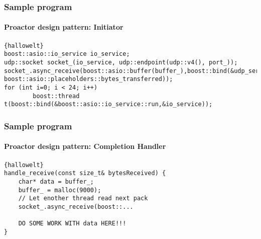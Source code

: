 \begin{frame}[fragile]
\frametitle{Sample program}
\framesubtitle{Proactor design pattern: Initiator}
\begin{lstlisting}[frame=trBL,caption={}]{hallowelt}
boost::asio::io_service io_service;
udp::socket socket_(io_service, udp::endpoint(udp::v4(), port_));
socket_.async_receive(boost::asio::buffer(buffer_),boost::bind(&udp_server::handle_receive,this, boost::asio::placeholders::bytes_transferred)); 
for (int i=0; i < 24; i++) 
		boost::thread t(boost::bind(&boost::asio::io_service::run,&io_service));
\end{lstlisting}
\end{frame}

\begin{frame}[fragile]
\frametitle{Sample program}
\framesubtitle{Proactor design pattern: Completion Handler}

\begin{lstlisting}[frame=trBL,caption={}]{hallowelt}
handle_receive(const size_t& bytesReceived) {
    char* data = buffer_;
    buffer_ = malloc(9000);
    // Let enother thread read next pack
    socket_.async_receive(boost::...
    
    DO SOME WORK WITH data HERE!!!
}
\end{lstlisting}
\end{frame}
